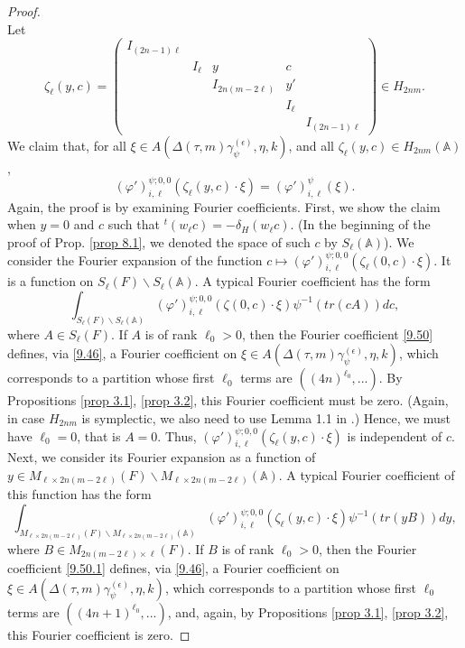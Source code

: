 \documentclass[12pts]{amsart}
\newcommand{\BA}{{\mathbb {A}}}
\begin{document}
\begin{proof}
\begin{equation}
\end{equation}
Let
\begin{equation}\label{9.48}
\zeta_\ell(y,c)=\begin{pmatrix}I_{(2n-1)\ell}\\&I_\ell&y&c\\&&I_{2n(m-2\ell)}&y'\\&&&I_\ell\\
&&&&I_{(2n-1)\ell}\end{pmatrix}\in H_{2nm}.
\end{equation}
We claim that, for all $\xi\in A(\Delta(\tau,m)\gamma_\psi^{(\epsilon)},\eta,k)$, and all $\zeta_\ell(y,c)\in H_{2nm}(\BA)$,
\begin{equation}\label{9.49}
(\varphi')_{i,\ell}^{\psi;0,0}(\zeta_\ell(y,c)\cdot\xi)=(\varphi')_{i,\ell}^\psi(\xi).
\end{equation} 
Again, the proof is by examining Fourier coefficients. First, we show the claim when $y=0$ and $c$ such that ${}^t(w_\ell c)=-\delta_H(w_\ell c)$. (In the beginning of the proof of Prop. \ref{prop 8.1}, we denoted the space of such $c$ by $S_\ell(\BA)$). We consider the Fourier expansion of the function $c\mapsto (\varphi')_{i,\ell}^{\psi;0,0}(\zeta_\ell(0,c)\cdot\xi)$. It is a function on $S_\ell(F)\backslash S_\ell(\BA)$. A typical Fourier coefficient has the form
\begin{equation}\label{9.50}
\int_{S_\ell(F)\backslash S_\ell(\BA)}(\varphi')_{i,\ell}^{\psi;0,0}(\zeta(0,c)\cdot\xi)\psi^{-1}(tr(cA))dc,
\end{equation}
where $A\in S_\ell(F)$. If $A$ is of rank $\ell_0>0$, then the Fourier coefficient \eqref{9.50} defines, via \eqref{9.46}, a Fourier coefficient on $\xi\in A(\Delta(\tau,m)\gamma_\psi^{(\epsilon)},\eta,k)$, which corresponds to a partition whose first $\ell_0$ terms are $((4n)^{\ell_0},...)$. By Propositions \ref{prop 3.1}, \ref{prop 3.2}, this Fourier coefficient must be zero. 
(Again, in case $H_{2nm}$ is symplectic, we also need to use Lemma 1.1 in \cite{GRS03}.) Hence, we must have $\ell_0=0$, that is $A=0$. Thus, $(\varphi')_{i,\ell}^{\psi;0,0}(\zeta_\ell(y,c)\cdot\xi)$ is independent of $c$. Next, we consider its Fourier expansion as a function of $y\in M_{\ell\times 2n(m-2\ell)}(F)\backslash M_{\ell\times 2n(m-2\ell)}(\BA)$. A typical Fourier coefficient of this function has the form
\begin{equation}\label{9.50.1}
\int_{M_{\ell\times 2n(m-2\ell)}(F)\backslash M_{\ell\times 2n(m-2\ell)}(\BA)}(\varphi')_{i,\ell}^{\psi;0,0}(\zeta_\ell(y,c)\cdot\xi)\psi^{-1}(tr(yB))dy,
\end{equation}
where $B\in M_{2n(m-2\ell)\times \ell}(F)$. If $B$ is of rank $\ell_0>0$, then the Fourier coefficient \eqref{9.50.1} defines, via \eqref{9.46}, a Fourier coefficient on $\xi\in A(\Delta(\tau,m)\gamma_\psi^{(\epsilon)},\eta,k)$, which corresponds to a partition whose first $\ell_0$ terms are $((4n+1)^{\ell_0},...)$, and, again, by Propositions \ref{prop 3.1}, \ref{prop 3.2}, this Fourier coefficient is zero. 


\end{proof}
\end{document}
